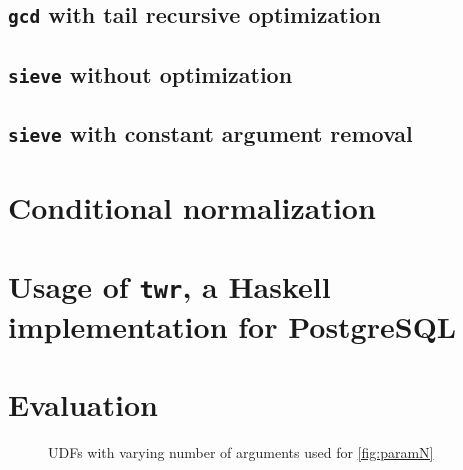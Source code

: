 \subsection{\texttt{gcd} with tail recursive optimization}
\subsection{\texttt{sieve} without optimization}
\subsection{\texttt{sieve} with constant argument removal}
\section{Conditional normalization}
\section{Usage of \texttt{twr}, a Haskell implementation for PostgreSQL}
\label{sql:conditionals}
\section{Evaluation}
\begin{figure}
    \centering
    \caption{UDFs with varying number of arguments used for \autoref{fig:paramN}}
    \label{udfs:paramN}
\end{figure}
